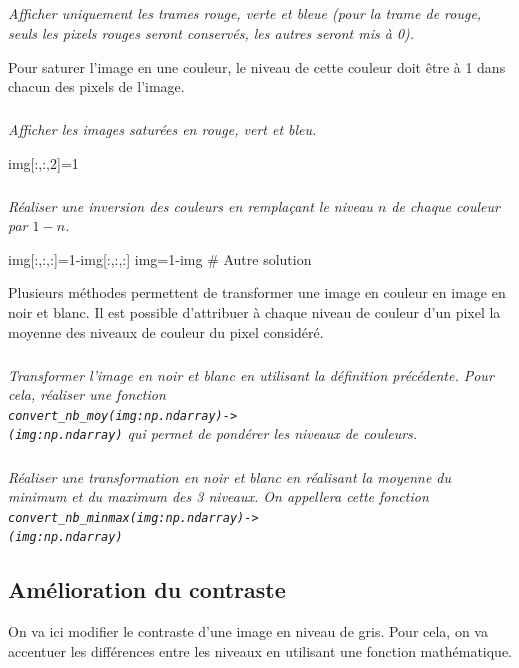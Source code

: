\documentclass[10pt,fleqn]{article} %
\begin{document}
\begin{multicols}{2}
\subparagraph{}\textit{Afficher uniquement les trames rouge, verte et bleue (pour la trame de rouge, seuls les pixels rouges seront conservés, les autres seront mis à 0).}

Pour saturer l'image en une couleur, le niveau de cette couleur doit être à 1 dans chacun des pixels de l'image. 

\subparagraph{}\textit{Afficher les images saturées en rouge, vert et bleu.}
\ifprof
\begin{corrige}
\begin{python}
img[:,:,2]=1
\end{python}
\end{corrige}
\else
\fi

\subparagraph{}\textit{Réaliser une inversion des couleurs en remplaçant le niveau $n$ de chaque couleur par $1-n$.}
\ifprof
\begin{corrige}
\begin{python}
img[:,:,:]=1-img[:,:,:]
img=1-img # Autre solution
\end{python}
\end{corrige}
\else
\fi

\vspace{.5cm}

Plusieurs méthodes permettent de transformer une image en couleur en image en noir et blanc. Il est possible d'attribuer à chaque niveau de couleur d'un pixel la moyenne des niveaux de couleur du pixel considéré. 


\subparagraph{}\textit{Transformer l'image en noir et blanc en utilisant la définition précédente. Pour cela, réaliser une fonction \\ \texttt{convert\_nb\_moy(img:np.ndarray)->} \\ 
\texttt{(img:np.ndarray)} qui permet de pondérer les niveaux de couleurs.}


\subparagraph{}\textit{Réaliser une transformation en noir et blanc en réalisant la moyenne du minimum et du maximum des 3 niveaux. On appellera cette fonction  \texttt{convert\_nb\_minmax(img:np.ndarray)->} \\ 
\texttt{(img:np.ndarray)}}

\subsection*{Amélioration du contraste}
On va ici modifier le contraste d'une image en niveau de gris. 
Pour cela, on va accentuer les différences entre les niveaux en utilisant une fonction mathématique. 


\end{multicols}
\end{document}

